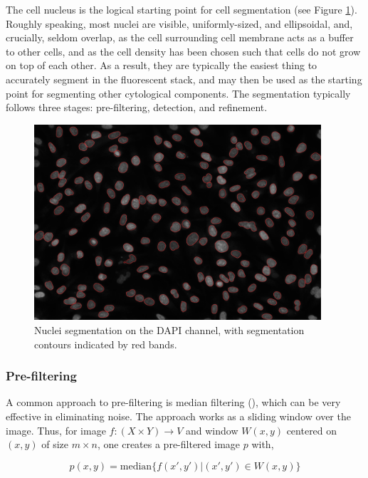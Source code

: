 The cell nucleus is the logical starting point for cell segmentation (see Figure \ref{fig:segmentation}). Roughly speaking, most nuclei are visible, uniformly-sized, and ellipsoidal, and, crucially, seldom overlap, as the cell surrounding cell membrane acts as a buffer to other cells, and as the cell density has been chosen such that cells do not grow on top of each other. As a result, they are typically the easiest thing to accurately segment in the fluorescent stack, and may then be used as the starting point for segmenting other cytological components. The segmentation typically follows three stages: pre-filtering, detection, and refinement.

\begin{figure}[ht]
\centering
\includegraphics[width=0.95\textwidth]{img/segmentation.png}
\caption{Nuclei segmentation on the DAPI channel, with segmentation contours indicated by red bands.}
\label{fig:segmentation}
\end{figure}

\subsubsection{Pre-filtering}

A common approach to pre-filtering is median filtering (\cite{huang1979fast}), which can be very effective in eliminating noise. The approach works as a sliding window over the image. Thus, for image $f: (X \times Y) \to V$ and window $W(x, y)$ centered on $(x, y)$ of size $m\times n$, one creates a pre-filtered image $p$ with,

\begin{equation}
p(x, y) = \text{median}\{f(x', y') | (x', y') \in W(x, y)\}
\end{equation}

